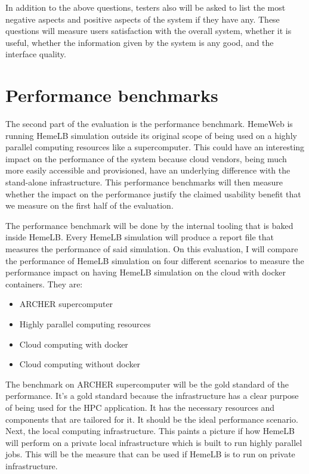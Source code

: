 In addition to the above questions, testers also will be asked to list the most negative aspects and positive aspects of the system if they have any. These questions will measure users satisfaction with the overall system, whether it is useful, whether the information given by the system is any good, and the interface quality.


\section{Performance benchmarks}

The second part of the evaluation is the performance benchmark. HemeWeb is running HemeLB simulation outside its original scope of being used on a highly parallel computing resources like a supercomputer. This could have an interesting impact on the performance of the system because cloud vendors, being much more easily accessible and provisioned, have an underlying difference with the stand-alone infrastructure. This performance benchmarks will then measure whether the impact on the performance justify the claimed usability benefit that we measure on the first half of the evaluation.

The performance benchmark will be done by the internal tooling that is baked inside HemeLB. Every HemeLB simulation will produce a report file that measures the performance of said simulation. On this evaluation, I will compare the performance of HemeLB simulation on four different scenarios to measure the performance impact on having HemeLB simulation on the cloud with docker containers. They are:
\begin{itemize}
	\item{ARCHER supercomputer}
	\item{Highly parallel computing resources}
	\item{Cloud computing with docker}
	\item{Cloud computing without docker}
\end{itemize}

The benchmark on ARCHER supercomputer will be the gold standard of the performance. It's a gold standard because the infrastructure has a clear purpose of being used for the HPC application. It has the necessary resources and components that are tailored for it. It should be the ideal performance scenario. Next, the local computing infrastructure. This paints a picture if how HemeLB will perform on a private local infrastructure which is built to run highly parallel jobs. This will be the measure that can be used if HemeLB is to run on private infrastructure.

